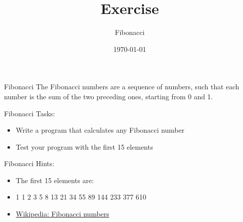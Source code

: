 


\title{Exercise}
\subtitle{Fibonacci}
\date{\today}




\begin{frame}
    \titlepage
\end{frame}

\begin{frame}{Fibonacci}
    The Fibonacci numbers are a sequence of numbers, such that each number is the sum of the two preceding ones, starting from 0 and 1.
\end{frame}

\begin{frame}{Fibonacci}
    Tasks:
    \begin{itemize}
        \item Write a program that calculates any Fibonacci number
        \item Test your program with the first 15 elements
    \end{itemize}
\end{frame}

\begin{frame}{Fibonacci}
    Hints:
    \begin{itemize}
        \item The first 15 elements are:
                \item 1 1 2 3 5 8 13 21 34 55 89 144 233 377 610
        \item \hyperlink{https://en.wikipedia.org/wiki/Fibonacci_number}{Wikipedia: Fibonacci numbers}
    \end{itemize}
\end{frame}



